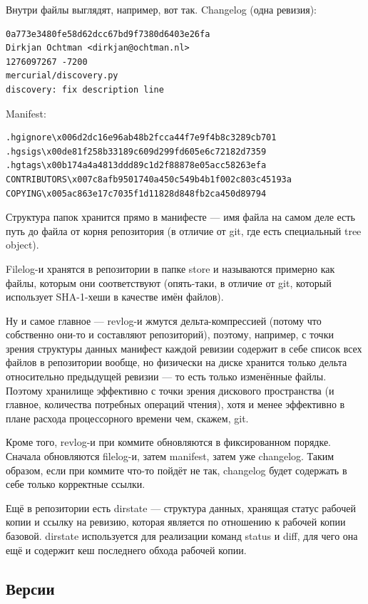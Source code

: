 \documentclass[a5paper]{article}
\begin{document}
Внутри файлы выглядят, например, вот так. Changelog (одна ревизия):

\begin{verbatim}
0a773e3480fe58d62dcc67bd9f7380d6403e26fa
Dirkjan Ochtman <dirkjan@ochtman.nl>
1276097267 -7200
mercurial/discovery.py
discovery: fix description line
\end{verbatim}

Manifest:
\begin{verbatim}
.hgignore\x006d2dc16e96ab48b2fcca44f7e9f4b8c3289cb701
.hgsigs\x00de81f258b33189c609d299fd605e6c72182d7359
.hgtags\x00b174a4a4813ddd89c1d2f88878e05acc58263efa
CONTRIBUTORS\x007c8afb9501740a450c549b4b1f002c803c45193a
COPYING\x005ac863e17c7035f1d11828d848fb2ca450d89794
\end{verbatim}

Структура папок хранится прямо в манифесте --- имя файла на самом деле есть путь до файла от корня репозитория (в отличие от git, где есть специальный tree object).

Filelog-и хранятся в репозитории в папке store и называются примерно как файлы, которым они соответствуют (опять-таки, в отличие от git, который использует SHA-1-хеши в качестве имён файлов).

Ну и самое главное --- revlog-и жмутся дельта-компрессией (потому что собственно они-то и составляют репозиторий), поэтому, например, с точки зрения структуры данных манифест каждой ревизии содержит в себе список всех файлов в репозитории вообще, но физически на диске хранится только дельта относительно предыдущей ревизии --- то есть только изменённые файлы. Поэтому хранилище эффективно с точки зрения дискового пространства (и главное, количества потребных операций чтения), хотя и менее эффективно в плане расхода процессорного времени чем, скажем, git.

Кроме того, revlog-и при коммите обновляются в фиксированном порядке. Сначала обновляются filelog-и, затем manifest, затем уже changelog. Таким образом, если при коммите что-то пойдёт не так, changelog будет содержать в себе только корректные ссылки.

Ещё в репозитории есть dirstate --- структура данных, хранящая статус рабочей копии и ссылку на ревизию, которая является по отношению к рабочей копии базовой. dirstate используется для реализации команд status и diff, для чего она ещё и содержит кеш последнего обхода рабочей копии.

\subsection{Версии}
\end{document}
